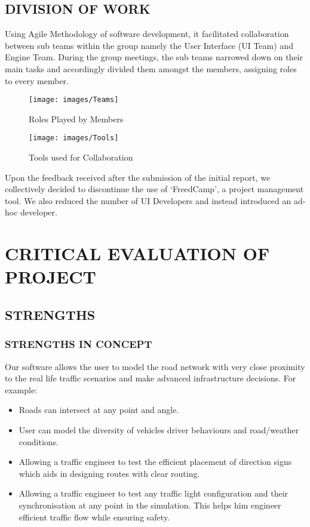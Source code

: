 \documentclass[11pt,a4paper]{article}
\begin{document}
  \subsection{DIVISION OF WORK}
  Using Agile Methodology of software development, it facilitated
  collaboration between sub teams within the group namely the User
  Interface (UI Team) and Engine Team. During the group meetings, the
  sub teams narrowed down on their main tasks and accordingly divided
  them amongst the members, assigning roles to every member.
		
  		\begin{figure}[h!]
			\texttt{[image: images/Teams]}
			\caption{Roles Played by Members}
			\centering
		\end{figure}
		
		\begin{figure}[h!]
			\texttt{[image: images/Tools]}
			\caption{Tools used for Collaboration}
			\centering
		\end{figure}
	\setlength{\parindent}{0cm}
  Upon the feedback received after the submission of the initial
  report, we collectively decided to discontinue the use of
  ‘FreedCamp’, a project management tool. We also reduced the number of
  UI Developers and instead introduced an ad-hoc developer.
  
\section{CRITICAL EVALUATION OF PROJECT}
	\subsection{STRENGTHS}
		\subsubsection{STRENGTHS IN CONCEPT}
		Our software allows the user to model the road network with very close proximity to the real life traffic scenarios and make advanced infrastructure decisions. For example:
		
		\begin{itemize}
			\item Roads can intersect at any point and angle.
			\item User can model the diversity of vehicles driver behaviours and road/weather conditions.
			\item Allowing a traffic engineer to test the efficient placement of direction signs which aids in designing routes with clear routing.
			\item Allowing a traffic engineer to test any traffic light configuration and their synchronisation at any point in the simulation. This helps him engineer efficient traffic flow while ensuring safety.
		\end{itemize}
		
\end{document}
